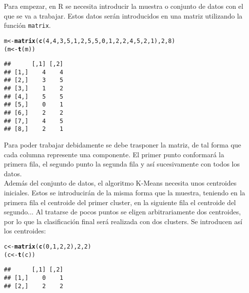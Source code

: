 \documentclass[12pt]{report}\usepackage[]{graphicx}\usepackage[dvipsnames]{xcolor}
\makeatletter
\newcommand{\hlnum}[1]{\textcolor[rgb]{0.686,0.059,0.569}{#1}}%
\newcommand{\hlstd}[1]{\textcolor[rgb]{0.345,0.345,0.345}{#1}}%
\newcommand{\hlkwb}[1]{\textcolor[rgb]{0.69,0.353,0.396}{#1}}%
\newcommand{\hlkwd}[1]{\textcolor[rgb]{0.737,0.353,0.396}{\textbf{#1}}}%
\newenvironment{kframe}{%
 \def\at@end@of@kframe{}%
 \ifinner\ifhmode%
  \def\at@end@of@kframe{\end{minipage}}%
  \begin{minipage}{\columnwidth}%
 \fi\fi%
 \def\FrameCommand##1{\hskip\@totalleftmargin \hskip-\fboxsep
 \colorbox{shadecolor}{##1}\hskip-\fboxsep
     \hskip-\linewidth \hskip-\@totalleftmargin \hskip\columnwidth}%
 \MakeFramed {\advance\hsize-\width
   \@totalleftmargin\z@ \linewidth\hsize
   \@setminipage}}%
 {\par\unskip\endMakeFramed%
 \at@end@of@kframe}
\newenvironment{knitrout}{}{} %
\makeatother
\begin{document}
	Para empezar, en R se necesita introducir la muestra o conjunto de datos con el que se va a trabajar. Estos datos serán introducidos en una matriz utilizando la función \texttt{matrix}.
	
\begin{knitrout}
\color{fgcolor}\begin{kframe}
\begin{alltt}
\hlstd{m}\hlkwb{<-}\hlkwd{matrix}\hlstd{(}\hlkwd{c}\hlstd{(}\hlnum{4}\hlstd{,}\hlnum{4}\hlstd{,} \hlnum{3}\hlstd{,}\hlnum{5}\hlstd{,} \hlnum{1}\hlstd{,}\hlnum{2}\hlstd{,} \hlnum{5}\hlstd{,}\hlnum{5}\hlstd{,} \hlnum{0}\hlstd{,}\hlnum{1}\hlstd{,} \hlnum{2}\hlstd{,}\hlnum{2}\hlstd{,} \hlnum{4}\hlstd{,}\hlnum{5}\hlstd{,} \hlnum{2}\hlstd{,}\hlnum{1}\hlstd{),}\hlnum{2}\hlstd{,}\hlnum{8}\hlstd{)}
\hlstd{(m}\hlkwb{<-}\hlkwd{t}\hlstd{(m))}
\end{alltt}
\begin{verbatim}
##      [,1] [,2]
## [1,]    4    4
## [2,]    3    5
## [3,]    1    2
## [4,]    5    5
## [5,]    0    1
## [6,]    2    2
## [7,]    4    5
## [8,]    2    1
\end{verbatim}
\end{kframe}
\end{knitrout}
	
	Para poder trabajar debidamente se debe trasponer la matriz, de tal forma que cada columna represente una componente. El primer punto conformará la primera fila, el segundo punto la segunda fila y así sucesivamente con todos los datos.\\
	
	Además del conjunto de datos, el algoritmo K-Means necesita unos centroides iniciales. Estos se introducirán de la misma forma que la muestra, teniendo en la primera fila el centroide del primer cluster, en la siguiente fila el centroide del segundo... Al tratarse de pocos puntos se eligen arbitrariamente dos centroides, por lo que la clasificación final será realizada con dos clusters. Se introducen así los centroides:
	
\begin{knitrout}
\color{fgcolor}\begin{kframe}
\begin{alltt}
\hlstd{c}\hlkwb{<-}\hlkwd{matrix}\hlstd{(}\hlkwd{c}\hlstd{(}\hlnum{0}\hlstd{,}\hlnum{1}\hlstd{,}\hlnum{2}\hlstd{,}\hlnum{2}\hlstd{),}\hlnum{2}\hlstd{,}\hlnum{2}\hlstd{)}
\hlstd{(c}\hlkwb{<-}\hlkwd{t}\hlstd{(c))}
\end{alltt}
\begin{verbatim}
##      [,1] [,2]
## [1,]    0    1
## [2,]    2    2
\end{verbatim}
\end{kframe}
\end{knitrout}
	
\end{document}

